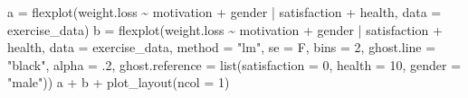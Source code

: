 \documentclass[
  english,
  man]{apa6}
\newenvironment{Shaded}{\begin{snugshade}}{\end{snugshade}}
\newcommand{\AttributeTok}[1]{\textcolor[rgb]{0.77,0.63,0.00}{#1}}
\newcommand{\DecValTok}[1]{\textcolor[rgb]{0.00,0.00,0.81}{#1}}
\newcommand{\FunctionTok}[1]{\textcolor[rgb]{0.00,0.00,0.00}{#1}}
\newcommand{\NormalTok}[1]{#1}
\newcommand{\OtherTok}[1]{\textcolor[rgb]{0.56,0.35,0.01}{#1}}
\newcommand{\SpecialCharTok}[1]{\textcolor[rgb]{0.00,0.00,0.00}{#1}}
\newcommand{\StringTok}[1]{\textcolor[rgb]{0.31,0.60,0.02}{#1}}
\begin{document}
\begin{Shaded}
\begin{Highlighting}[]
\NormalTok{a }\OtherTok{=} \FunctionTok{flexplot}\NormalTok{(weight.loss }\SpecialCharTok{\textasciitilde{}}\NormalTok{ motivation }\SpecialCharTok{+}\NormalTok{ gender }\SpecialCharTok{|}\NormalTok{ satisfaction }\SpecialCharTok{+}\NormalTok{ health, }
    \AttributeTok{data =}\NormalTok{ exercise\_data) }
\NormalTok{b }\OtherTok{=} \FunctionTok{flexplot}\NormalTok{(weight.loss }\SpecialCharTok{\textasciitilde{}}\NormalTok{ motivation }\SpecialCharTok{+}\NormalTok{ gender }\SpecialCharTok{|}\NormalTok{ satisfaction }\SpecialCharTok{+}\NormalTok{ health, }
    \AttributeTok{data =}\NormalTok{ exercise\_data, }
    \AttributeTok{method =} \StringTok{"lm"}\NormalTok{, }\AttributeTok{se =}\NormalTok{ F, }\AttributeTok{bins =} \DecValTok{2}\NormalTok{, }\AttributeTok{ghost.line =} \StringTok{"black"}\NormalTok{, }\AttributeTok{alpha =}\NormalTok{ .}\DecValTok{2}\NormalTok{,}
    \AttributeTok{ghost.reference =} \FunctionTok{list}\NormalTok{(}\AttributeTok{satisfaction =} \DecValTok{0}\NormalTok{, }\AttributeTok{health =} \DecValTok{10}\NormalTok{, }\AttributeTok{gender =} \StringTok{"male"}\NormalTok{))}
\NormalTok{a }\SpecialCharTok{+}\NormalTok{ b }\SpecialCharTok{+} \FunctionTok{plot\_layout}\NormalTok{(}\AttributeTok{ncol =} \DecValTok{1}\NormalTok{)}
\end{Highlighting}
\end{Shaded}
\end{document}
